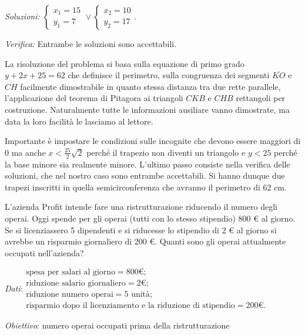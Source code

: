 \emph{Soluzioni: } $\left\{\begin{array}{l}{x_1=15}\\{y_1=7}\end{array}\right.\vee \left\{\begin{array}{l}{x_2=10}\\{y_2=17}\end{array}\right.$.

\emph{Verifica: }Entrambe le soluzioni sono accettabili.

La risoluzione del problema si basa sulla equazione di primo grado $y+2x+25=62$ che definisce il perimetro, sulla congruenza dei segmenti $\overline{{KO}}$ e $\overline{{CH}}$ facilmente dimostrabile in quanto stessa distanza tra due rette parallele, l'applicazione del teorema di Pitagora ai triangoli ${CKB}$ e ${CHB}$ rettangoli per costruzione. Naturalmente tutte le informazioni ausiliare vanno dimostrate, ma data la loro facilità le lasciamo al lettore.

Importante è impostare le condizioni sulle incognite che devono essere maggiori di $0$ ma anche $x<\frac{25} 2\sqrt 2$ perché il trapezio non diventi un triangolo e $y<25$ perché la base minore sia realmente minore. L'ultimo passo consiste nella verifica delle soluzioni, che nel nostro caso sono entrambe accettabili. Si hanno dunque due trapezi inscritti in quella semicirconferenza che avranno il perimetro di 62 cm.

\begin{problema}
L'azienda Profit intende fare una ristrutturazione riducendo il numero degli operai. Oggi spende per gli operai (tutti con lo stesso stipendio) 800 € al giorno. Se si licenziassero 5 dipendenti e si riducesse lo stipendio di 2 € al giorno si avrebbe un risparmio giornaliero di 200 €. Quanti sono gli operai attualmente occupati nell'azienda?
\end{problema}

\emph{Dati}:$ \begin{array}{l}
\text{spesa per salari al giorno}= 800\unit{\text{€}};\\
\text{riduzione salario giornaliero}= 2\unit{\text{€}};\\
\text{riduzione numero operai}= 5\text{ unità};\\
\text{risparmio dopo il licenziamento e la riduzione di stipendio}= 200\unit{\text{€}}.
\end{array}$

\emph{Obiettivo}: numero operai occupati prima della ristrutturazione

